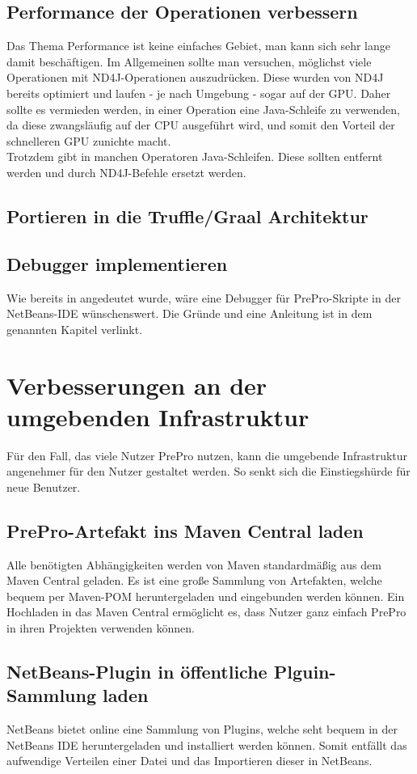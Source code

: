 \subsection{Performance der Operationen verbessern}
Das Thema Performance ist keine einfaches Gebiet, man kann sich sehr lange damit beschäftigen.
Im Allgemeinen sollte man versuchen, möglichst viele Operationen mit ND4J-Operationen auszudrücken.
Diese wurden von ND4J bereits optimiert und laufen - je nach Umgebung - sogar auf der \ac{GPU}.
Daher sollte es vermieden werden, in einer Operation eine Java-Schleife zu verwenden, da diese zwangsläufig auf der \ac{CPU} ausgeführt wird, und somit den Vorteil der schnelleren \ac{GPU} zunichte macht.\\
Trotzdem gibt in manchen Operatoren Java-Schleifen.
Diese sollten entfernt werden und durch ND4J-Befehle ersetzt werden.

\subsection{Portieren in die Truffle/Graal Architektur}

\subsection{Debugger implementieren}
Wie bereits in  angedeutet wurde, wäre eine Debugger für PrePro-Skripte in der NetBeans-IDE wünschenswert.
Die Gründe und eine Anleitung ist in dem genannten Kapitel verlinkt.

\section{Verbesserungen an der umgebenden Infrastruktur}
Für den Fall, das viele Nutzer PrePro nutzen, kann die umgebende Infrastruktur angenehmer für den Nutzer gestaltet werden.
So senkt sich die Einstiegshürde für neue Benutzer.

\subsection{PrePro-Artefakt ins Maven Central laden}
Alle benötigten Abhängigkeiten werden von Maven standardmäßig aus dem Maven Central geladen.
Es ist eine große Sammlung von Artefakten, welche bequem per Maven-\ac{POM} heruntergeladen und eingebunden werden können.
Ein Hochladen in das Maven Central ermöglicht es, dass Nutzer ganz einfach PrePro in ihren Projekten verwenden können.

\subsection{NetBeans-Plugin in öffentliche Plguin-Sammlung laden}
NetBeans bietet online eine Sammlung von Plugins, welche seht bequem in der NetBeans IDE heruntergeladen und installiert werden können.
Somit entfällt das aufwendige Verteilen einer Datei und das Importieren dieser in NetBeans.

\endinput
